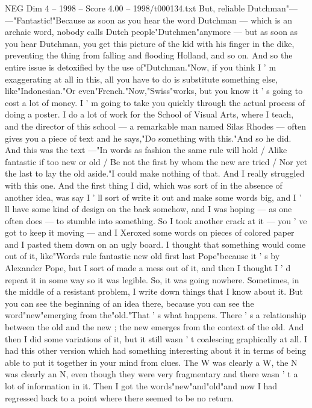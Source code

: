 \begin{textsample}{NEG Dim 4 – 1998 – Score 4.00 – 1998/t000134.txt}
But, reliable Dutchman"— —"Fantastic!"Because as soon as you hear the word Dutchman — which is an archaic word, nobody calls Dutch people"Dutchmen"anymore — but as soon as you hear Dutchman, you get this picture of the kid with his finger in the dike, preventing the thing from falling and flooding Holland, and so on.
And so the entire issue is detoxified by the use of"Dutchman."Now, if you think I ' m exaggerating at all in this, all you have to do is substitute something else, like"Indonesian."Or even"French."Now,"Swiss"works, but you know it ' s going to cost a lot of money.
I ' m going to take you quickly through the actual process of doing a poster.
I do a lot of work for the School of Visual Arts, where I teach, and the director of this school — a remarkable man named Silas Rhodes — often gives you a piece of text and he says,"Do something with this."And so he did.
And this was the text —"In words as fashion the same rule will hold / Alike fantastic if too new or old / Be not the first by whom the new are tried / Nor yet the last to lay the old aside."I could make nothing of that.
And I really struggled with this one.
And the first thing I did, which was sort of in the absence of another idea, was say I ' ll sort of write it out and make some words big, and I ' ll have some kind of design on the back somehow, and I was hoping — as one often does — to stumble into something.
So I took another crack at it — you ' ve got to keep it moving — and I Xeroxed some words on pieces of colored paper and I pasted them down on an ugly board.
I thought that something would come out of it, like"Words rule fantastic new old first last Pope"because it ' s by Alexander Pope, but I sort of made a mess out of it, and then I thought I ' d repeat it in some way so it was legible.
So, it was going nowhere.
Sometimes, in the middle of a resistant problem, I write down things that I know about it.
But you can see the beginning of an idea there, because you can see the word"new"emerging from the"old."That ' s what happens.
There ' s a relationship between the old and the new ; the new emerges from the context of the old.
And then I did some variations of it, but it still wasn ' t coalescing graphically at all.
I had this other version which had something interesting about it in terms of being able to put it together in your mind from clues.
The W was clearly a W, the N was clearly an N, even though they were very fragmentary and there wasn ' t a lot of information in it.
Then I got the words"new"and"old"and now I had regressed back to a point where there seemed to be no return.

\end{textsample}
